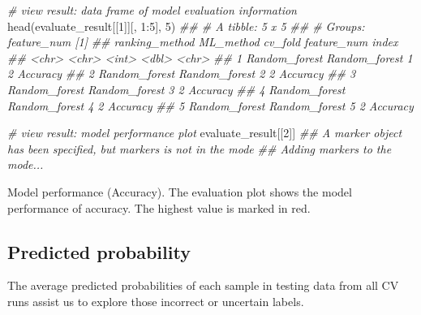 \documentclass[]{article}
\newcommand{\hlnum}[1]{\textcolor[rgb]{0.816,0.125,0.439}{#1}}%
\newcommand{\hlcom}[1]{\textcolor[rgb]{0.502,0.502,0.502}{\textit{#1}}}%
\newcommand{\hlopt}[1]{\textcolor[rgb]{0,0,0}{#1}}%
\newcommand{\hlstd}[1]{\textcolor[rgb]{0.251,0.251,0.251}{#1}}%
\newcommand{\hlkwd}[1]{\textcolor[rgb]{0.878,0.439,0.125}{#1}}%
\newenvironment{Shaded}{\begin{myshaded}}{\end{myshaded}}
\newcommand{\KeywordTok}[1]{\hlkwd{#1}}
\newcommand{\DecValTok}[1]{\hlnum{#1}}
\newcommand{\CommentTok}[1]{\hlcom{#1}}
\newcommand{\OperatorTok}[1]{\hlopt{#1}}
\newcommand{\NormalTok}[1]{\hlstd{#1}}
\begin{document}
\begin{Shaded}
\begin{Highlighting}[]
\CommentTok{# view result: data frame of model evaluation information}
\KeywordTok{head}\NormalTok{(evaluate_result[[}\DecValTok{1}\NormalTok{]][, }\DecValTok{1}\OperatorTok{:}\DecValTok{5}\NormalTok{], }\DecValTok{5}\NormalTok{)}
\CommentTok{## # A tibble: 5 x 5}
\CommentTok{## # Groups:   feature_num [1]}
\CommentTok{##   ranking_method ML_method     cv_fold feature_num index   }
\CommentTok{##   <chr>          <chr>           <int>       <dbl> <chr>   }
\CommentTok{## 1 Random_forest  Random_forest       1           2 Accuracy}
\CommentTok{## 2 Random_forest  Random_forest       2           2 Accuracy}
\CommentTok{## 3 Random_forest  Random_forest       3           2 Accuracy}
\CommentTok{## 4 Random_forest  Random_forest       4           2 Accuracy}
\CommentTok{## 5 Random_forest  Random_forest       5           2 Accuracy}
\end{Highlighting}
\end{Shaded}

\begin{Shaded}
\begin{Highlighting}[]
\CommentTok{# view result: model performance plot}
\NormalTok{evaluate_result[[}\DecValTok{2}\NormalTok{]]         }
\CommentTok{## A marker object has been specified, but markers is not in the mode}
\CommentTok{## Adding markers to the mode...}
\end{Highlighting}
\end{Shaded}

\label{fig:unnamed-chunk-59}Model performance (Accuracy). The evaluation plot shows the model performance of accuracy. The highest value is marked in red.

\hypertarget{predicted-probability}{%
\subsection{Predicted probability}\label{predicted-probability}}

The average predicted probabilities of each sample in testing data from all CV runs assist us to explore those incorrect or uncertain labels.
\end{document}
